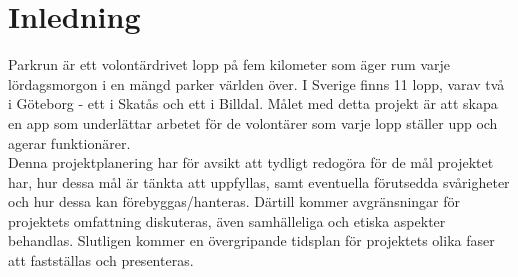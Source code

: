 \section{Inledning} 
Parkrun\cite{omOss} är ett volontärdrivet lopp på fem kilometer som äger rum varje lördagsmorgon i en mängd parker världen över. I Sverige finns 11 lopp, varav två i Göteborg - ett i Skatås och ett i Billdal. Målet med detta projekt är att skapa en app som underlättar arbetet för de volontärer som varje lopp ställer upp och agerar funktionärer. \\
Denna projektplanering har för avsikt att tydligt redogöra för de mål projektet har, hur dessa mål är tänkta att uppfyllas, samt eventuella förutsedda svårigheter och hur dessa kan förebyggas/hanteras. Därtill kommer avgränsningar för projektets omfattning diskuteras, även samhälleliga och etiska aspekter behandlas. Slutligen kommer en övergripande tidsplan för projektets olika faser att fastställas och presenteras.

